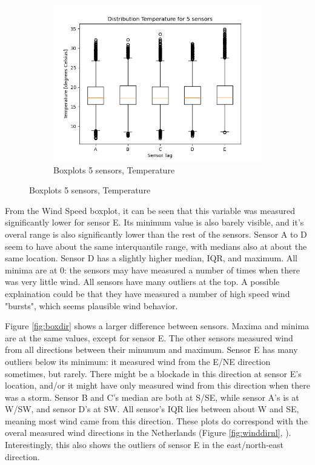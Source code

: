 \documentclass{report}
\begin{document}
\begin{figure}[H]
		\begin{subfigure}[b]{0.7\linewidth}
			\includegraphics[width=\linewidth]{GEO1001_hw01_images/GEO1001_hw01_A1_box_temp.png}
			\caption{Boxplots 5 sensors, Temperature}
			\label{fig:boxtemp}
		\end{subfigure}
	\end{figure}

	From the Wind Speed boxplot, it can be seen that this variable was measured significantly lower for sensor E. Its minimum value is also barely visible, and it's overal range is also significantly lower than the rest of the sensors. Sensor A to D seem to have about the same interquantile range, with medians also at about the same location. Sensor D has a slightly higher median, IQR, and maximum. All minima are at 0: the sensors may have measured a number of times when there was very little wind. All sensors have many outliers at the top. A possible explaination could be that they have measured a number of high speed wind "bursts", which seems plausible wind behavior.
	
	Figure \ref{fig:boxdir} shows a larger difference between sensors. Maxima and minima are at the same values, except for sensor E. The other sensors measured wind from all directions between their minumum and maximum. Sensor E has many outliers below its minimum: it measured wind from the E/NE direction sometimes, but rarely. There might be a blockade in this direction at sensor E's location, and/or it might have only measured wind from this direction when there was a storm. Sensor B and C's median are both at S/SE, while sensor A's is at W/SW, and sensor D's at SW. All sensor's IQR lies between about W and SE, meaning most wind came from this direction. These plots do correspond with the overal measured wind directions in the Netherlands (Figure \ref{fig:winddirnl}, \cite{journalpone}). Interestingly, this also shows the outliers of sensor E in the east/north-east direction.
	
\end{document}
